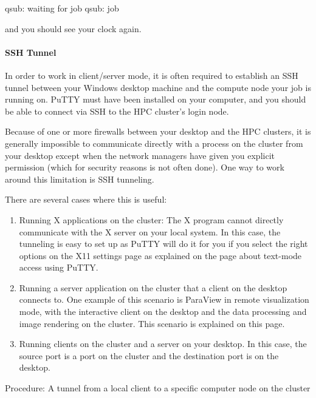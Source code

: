   \begin{prompt}
  qsub: waiting for job %
  qsub: job %
  \end{prompt}

  and you should see your clock again.

  \paragraph{SSH Tunnel}

  In order to work in client/server mode, it is often required to establish an
  SSH tunnel between your Windows desktop machine and the compute node your job
  is running on.  PuTTY must have been installed on your computer, and you should
  be able to connect via SSH to the HPC cluster's login node.

  Because of one or more firewalls between your desktop and the HPC clusters, it
  is generally impossible to communicate directly with a process on the cluster
  from your desktop except when the network managers have given you explicit
  permission (which for security reasons is not often done). One way to work
  around this limitation is SSH tunneling.

  There are several cases where this is useful:

  \begin{enumerate}
  \item  Running X applications on the cluster: The X program cannot directly
    communicate with the X server on your local system. In this case, the
    tunneling is easy to set up as PuTTY will do it for you if you select the
    right options on the X11 settings page as explained on the page about
    text-mode access using PuTTY.
  \item  Running a server application on the cluster that a client on the desktop
    connects to. One example of this scenario is ParaView in remote visualization
    mode, with the interactive client on the desktop and the data processing and
    image rendering on the cluster. This scenario is explained on this page.
  \item  Running clients on the cluster and a server on your desktop. In this
    case, the source port is a port on the cluster and the destination port is on
    the desktop.
  \end{enumerate}

  Procedure: A tunnel from a local client to a specific computer node on the cluster

